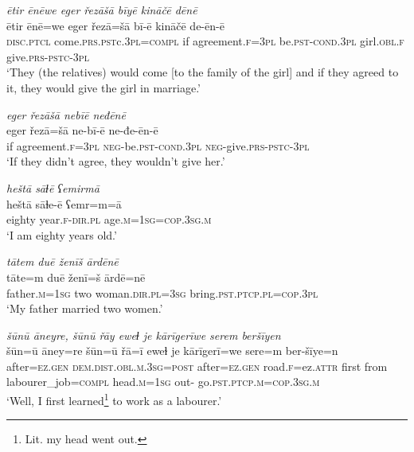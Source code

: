\ea \label{ŽE.84}
\textit{ētir ēnēwe eger řezāšā bīyē kināčē dēnē} \\ 
\gll ētir ēnē=we eger řezā=šā bī-ē kināčē de-ēn-ē \\ 
 \textsc{disc}.\textsc{ptcl} come\textsc{.prs}\textsc{.pst}c\textsc{.3pl}\textsc{=compl} if agreement\textsc{.f}\textsc{=3pl} be\textsc{.pst}\textsc{-cond}\textsc{.3pl} girl\textsc{.obl}\textsc{.f} give\textsc{.prs}\textsc{-pstc-3pl} \\ 
\glt `They (the relatives) would come [to the family of the girl] and if they agreed to it, they would give the girl in marriage.'
\z 
 
\ea \label{ŽE.85}
\textit{eger řezāšā nebīē neđēnē} \\ 
\gll eger řezā=šā ne-bī-ē ne-đe-ēn-ē \\ 
 if agreement\textsc{.f}\textsc{=3pl} \textsc{neg-}be\textsc{.pst}\textsc{-cond}\textsc{.3pl} \textsc{neg-}give\textsc{.prs}\textsc{-pstc-3pl} \\ 
\glt `If they didn’t agree, they wouldn’t give her.'
\z 
 

\ea \label{ŽM.1}
\textit{heštā sāɫē ʕemirmā} \\ 
\gll heštā sāɫe-ē ʕemr=m=ā \\ 
 eighty year\textsc{.f}\textsc{-dir}\textsc{.pl} age\textsc{.m}\textsc{=\textsc{1sg}}\textsc{=cop}\textsc{.3sg}\textsc{.m} \\ 
\glt `I am eighty years old.'
\z 
 
\ea \label{ŽM.2}
\textit{tātem duē ženīš ārdēnē} \\ 
\gll tāte=m duē ženī=š ārdē=nē \\ 
 father\textsc{.m}\textsc{=\textsc{1sg}} two woman\textsc{.dir}\textsc{.pl}\textsc{=3sg} bring\textsc{.pst}\textsc{.ptcp}\textsc{.pl}\textsc{=cop}\textsc{.3pl} \\ 
\glt `My father married two women.'
\z 
 
\ea \label{ŽM.4}
\textit{šūnū āneyre, šūnū řāy eweɫ je kārīgerīwe serem beršīyen} \\ 
\gll šūn=ū āney=re šūn=ū řā=ī eweɫ je kārīgerī=we sere=m ber-šīye=n \\ 
 after\textsc{=ez.gen} \textsc{dem.dist}\textsc{.obl}\textsc{.m}\textsc{.3sg}\textsc{=\textsc{post}} after\textsc{=ez.gen} road\textsc{.f}=ez.\textsc{attr} first from labourer\_job\textsc{=compl} head\textsc{.m}\textsc{=\textsc{1sg}} out- go\textsc{.pst}\textsc{.ptcp}\textsc{.m}\textsc{=cop}\textsc{.3sg}\textsc{.m} \\ 
\glt `Well, I first learned\footnote{Lit. my head went out.}  to work as a labourer.'
\z 
 
